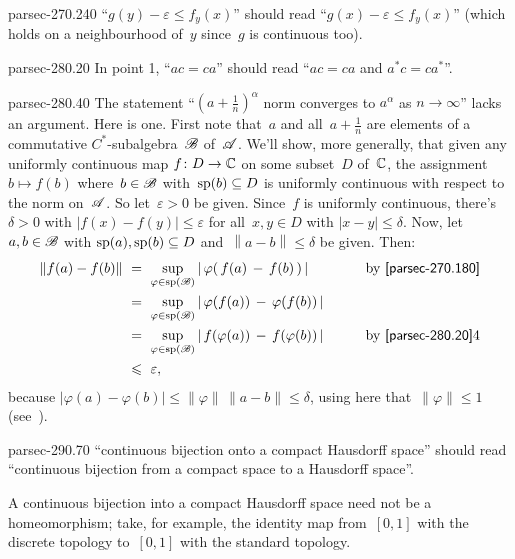 \documentclass[b5page]{book}
\begin{document}
\begin{erratum}{parsec-270.240}%
``$g(y)-\varepsilon\leq f_y(x)$''
should read
``$g(x)-\varepsilon\leq f_y(x)$''
(which holds on a neighbourhood of~$y$ since~$g$ is continuous too).
\end{erratum}
\begin{erratum}{parsec-280.20}
In point 1,
``$ac=ca$'' should read
``$ac=ca$ and $a^*c=ca^*$''.
\end{erratum}
\begin{addendum}{parsec-280.40}
The statement ``$(a+\frac{1}{n})^\alpha$
norm converges to $a^\alpha$ as $n\to\infty$''
lacks an argument.
Here is one.
First note that~$a$ and all~$a+\frac{1}{n}$
are elements of a commutative $C^*$-subalgebra~$\mathscr{B}$
of~$\mathscr{A}$.
We'll show, more generally,
that given any uniformly continuous map $f\colon D\to\mathbb{C}$
on some subset~$D$ of~$\mathbb{C}$,
the assignment $b\mapsto f(b)$
where~$b\in \mathscr{B}$ with~$\mathrm{sp}(b)\subseteq D$
is uniformly continuous
with respect to the norm on~$\mathscr{A}$.
So let~$\varepsilon>0$ be given.
Since~$f$ is uniformly continuous,
there's $\delta>0$ with $\left|f(x)-f(y)\right|\leq\varepsilon$
for all~$x,y\in D$ with $\left|x-y\right|\leq \delta$.
Now, let~$a,b\in \mathscr{B}$ with
$\mathrm{sp}(a),\mathrm{sp}(b)\subseteq D$
and~$\left\|a-b\right\|\leq \delta$ be given. Then:
\begin{alignat*}{3}
\|f(a)-f(b)\|
\ &= \ \sup_{\varphi\in \spec(\scrB)}
\left|\,\varphi(\,f(a)\,-\,f(b)\,)\,\right|\qquad
&&\text{by~\sref{parsec-270.180}}
\\
\ &=\ \sup_{\varphi\in\spec(\scrB)}\left|
\,\varphi(f(a))\,-\,\varphi(f(b))\,\right|\qquad
&&
\\
\ &=\ \sup_{\varphi\in\spec(\scrB)}\left|
\,f(\varphi(a))\,-\,f(\varphi(b))\,\right|\qquad
&&\text{by~\sref{parsec-280.20}4}
\\
\ &\leq\ \varepsilon,
\end{alignat*}
because $\left|\varphi(a)-\varphi(b)\right|
\leq \|\varphi\|\,\|a-b\|\leq \delta$,
using here that~$\|\varphi\|\leq 1$
(see~).
\end{addendum}
\begin{erratum}{parsec-290.70}
``continuous bijection onto a compact Hausdorff space''
should read
``continuous bijection from a compact space
to a Hausdorff space''.

A continuous bijection into a compact Hausdorff space need not be a
homeomorphism; take, for example, the identity map from~$[0,1]$
with the discrete topology to~$[0,1]$ with the standard topology.
\end{erratum}
\end{document}
